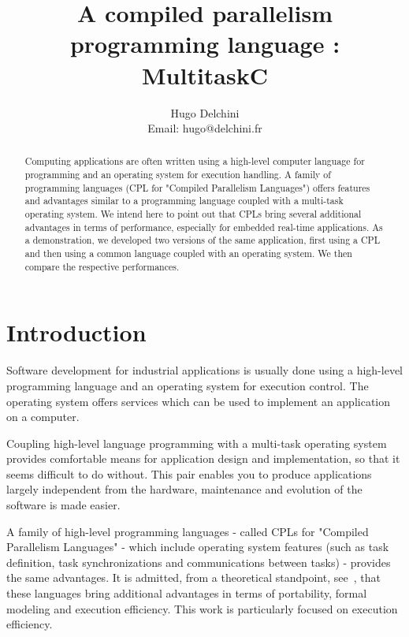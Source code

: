 \documentclass[10pt]{report}
\begin{document}
\title{A compiled parallelism programming language : MultitaskC}

\author{
Hugo Delchini\\
Email: hugo@delchini.fr\\
}

\maketitle
\thispagestyle{empty}

\begin{abstract}

Computing applications are often written using a high-level
computer language for programming and an operating system for
execution handling. A family of programming languages (CPL for
"Compiled Parallelism Languages") offers features and advantages
similar to a programming language coupled with a multi-task
operating system. We intend here to point out that CPLs bring
several additional advantages in terms of performance, especially
for embedded real-time applications. As a demonstration, we
developed two versions of the same application, first using a CPL
and then using a common language coupled with an operating
system. We then compare the respective performances.

\end{abstract}

\tableofcontents

\chapter{Introduction}
\label{sec:intro}

Software development for industrial applications is usually done
using a high-level programming language and an operating system
for execution control. The operating system offers services which
can be used to implement an application on a computer.

Coupling high-level language programming with a multi-task
operating system provides comfortable means for application
design and implementation, so that it seems difficult to do
without. This pair enables you to produce applications largely
independent from the hardware, maintenance and evolution of the
software is made easier.

A family of high-level programming languages - called CPLs for
"Compiled Parallelism Languages" - which include operating system
features (such as task definition, task synchronizations and
communications between tasks) - provides the same advantages. It is
admitted, from a theoretical standpoint, see~\cite{Halbwachs:91}, that
these languages bring additional advantages in terms of
portability, formal modeling and execution efficiency. This work
is particularly focused on execution efficiency.
\end{document}
